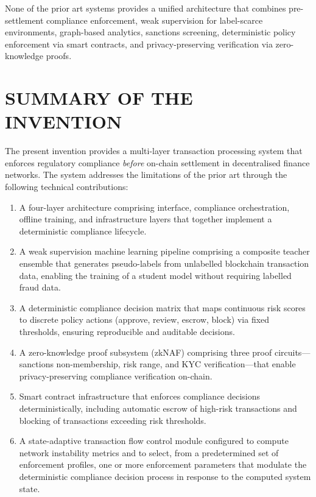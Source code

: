\documentclass[12pt,a4paper]{article}
\begin{document}
None of the prior art systems provides a unified architecture that combines 
pre-settlement compliance enforcement, weak supervision for label-scarce 
environments, graph-based analytics, sanctions screening, deterministic 
policy enforcement via smart contracts, and privacy-preserving verification 
via zero-knowledge proofs.

\section{SUMMARY OF THE INVENTION}

The present invention provides a multi-layer transaction processing system 
that enforces regulatory compliance \emph{before} on-chain settlement in 
decentralised finance networks. The system addresses the limitations of the 
prior art through the following technical contributions:

\begin{enumerate}[label=(\roman*)]
\item A four-layer architecture comprising interface, compliance 
orchestration, offline training, and infrastructure layers that together 
implement a deterministic compliance lifecycle.

\item A weak supervision machine learning pipeline comprising a composite 
teacher ensemble that generates pseudo-labels from unlabelled blockchain 
transaction data, enabling the training of a student model without requiring 
labelled fraud data.

\item A deterministic compliance decision matrix that maps continuous risk 
scores to discrete policy actions (approve, review, escrow, block) via fixed 
thresholds, ensuring reproducible and auditable decisions.

\item A zero-knowledge proof subsystem (zkNAF) comprising three proof 
circuits---sanctions non-membership, risk range, and KYC verification---that 
enable privacy-preserving compliance verification on-chain.

\item Smart contract infrastructure that enforces compliance decisions 
deterministically, including automatic escrow of high-risk transactions and 
blocking of transactions exceeding risk thresholds.

\item A state-adaptive transaction flow control module configured to compute 
network instability metrics and to select, from a predetermined set of 
enforcement profiles, one or more enforcement parameters that modulate the 
deterministic compliance decision process in response to the computed system 
state.
\end{enumerate}
\end{document}
